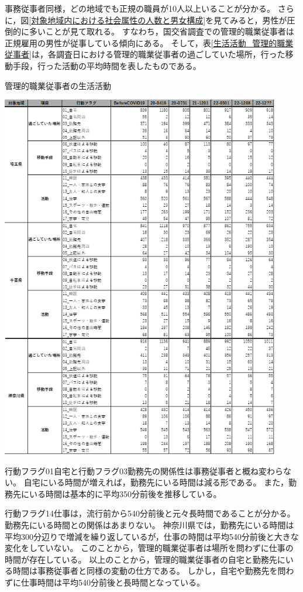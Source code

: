 \documentclass[paper={210mm,297mm},fontsize=15Q,line_length=35zw,number_of_lines=31,head_space=30mm,gutter=40mm,baselineskip=2.0zw,headfoot_verticalposition=1.5zw]{jlreq}
\begin{document}
事務従事者同様，どの地域でも正規の職員が10人以上いることが分かる。
さらに，図\ref{対象地域内における社会属性の人数と男女構成}を見てみると，男性が圧倒的に多いことが見て取れる。
すなわち，国交省調査での管理的職業従事者は正規雇用の男性が従事している傾向にある。
そして，表\ref{生活活動_管理的職業従事者}は，各調査日における管理的職業従事者の過ごしていた場所，行った移動手段，行った活動の平均時間を表したものである。

\begin{table}[H]
  \centering
  \caption{管理的職業従事者の生活活動}
  \includegraphics[width=122mm]{../Figure/c04s02_table_管理的職業従事者_生活活動.png}
  \label{生活活動_管理的職業従事者}
\end{table}

行動フラグ01自宅と行動フラグ03勤務先の関係性は事務従事者と概ね変わらない。
自宅にいる時間が増えれば，勤務先にいる時間は減る形である。
また，勤務先にいる時間は基本的に平均350分前後を推移している。

行動フラグ14仕事は，流行前から540分前後と元々長時間であることが分かる。
勤務先にいる時間との関係はあまりない。
神奈川県では，勤務先にいる時間は平均300分辺りで増減を繰り返しているが，仕事の時間は平均540分前後と大きな変化をしていない。
このことから，管理的職業従事者は場所を問わずに仕事の時間が存在している。
以上のことから，管理的職業従事者の自宅と勤務先にいる時間は事務従事者と同様の変動の仕方である。
しかし，自宅や勤務先を問わずに仕事時間は平均540分前後と長時間となっている。
\end{document}
